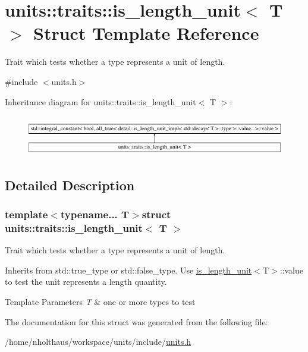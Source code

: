 \hypertarget{structunits_1_1traits_1_1is__length__unit}{}\section{units\+:\+:traits\+:\+:is\+\_\+length\+\_\+unit$<$ T $>$ Struct Template Reference}
\label{structunits_1_1traits_1_1is__length__unit}


Trait which tests whether a type represents a unit of length.  




{\ttfamily \#include $<$units.\+h$>$}

Inheritance diagram for units\+:\+:traits\+:\+:is\+\_\+length\+\_\+unit$<$ T $>$\+:\begin{figure}[H]
\begin{center}
\leavevmode
\includegraphics[height=1.789137cm]{structunits_1_1traits_1_1is__length__unit}
\end{center}
\end{figure}


\subsection{Detailed Description}
\subsubsection*{template$<$typename... T$>$struct units\+::traits\+::is\+\_\+length\+\_\+unit$<$ T $>$}

Trait which tests whether a type represents a unit of length. 

Inherits from {\ttfamily std\+::true\+\_\+type} or {\ttfamily std\+::false\+\_\+type}. Use {\ttfamily \hyperlink{structunits_1_1traits_1_1is__length__unit}{is\+\_\+length\+\_\+unit}$<$T$>$\+::value} to test the unit represents a length quantity. 
\begin{DoxyTemplParams}{Template Parameters}
{\em T} & one or more types to test \\
\hline
\end{DoxyTemplParams}


The documentation for this struct was generated from the following file\+:\begin{DoxyCompactItemize}
\item 
/home/nholthaus/workspace/units/include/\hyperlink{units_8h}{units.\+h}\end{DoxyCompactItemize}
